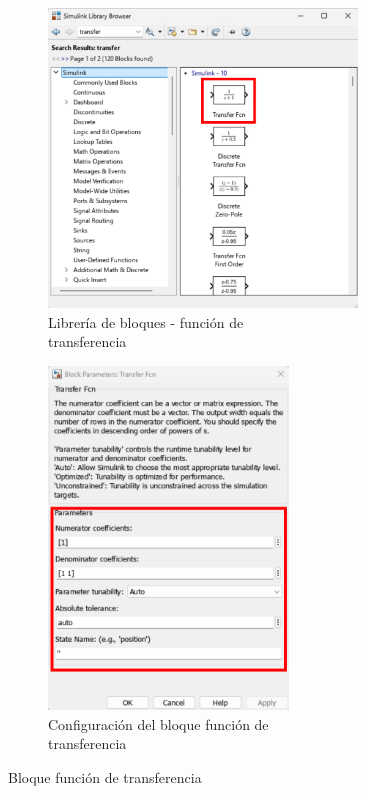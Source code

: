 \begin{figure}[htbp]
    \centering
    \begin{subfigure}[b]{0.45\textwidth}
        \centering
        \includegraphics[width=0.9\textwidth]{fig/especifico_2/CASO_ESTUDIO_FILTRO/Transfer_func.pdf}
        \caption{Librería de bloques - función de \\ transferencia}
        \label{fig:lib_bloq_transfer_func}
    \end{subfigure}
    \hfill
    \begin{subfigure}[b]{0.45\textwidth}
        \centering
        \includegraphics[width=0.7\textwidth]{fig/especifico_2/CASO_ESTUDIO_FILTRO/Transfer_func_1.pdf}
        \caption{Configuración del bloque función de \\ transferencia}
        \label{fig:lib_bloq_transfer_func_conf}
    \end{subfigure}
    \caption{Bloque función de transferencia}
    \label{fig:lib_bloq_transfer_func_all}
\end{figure}

